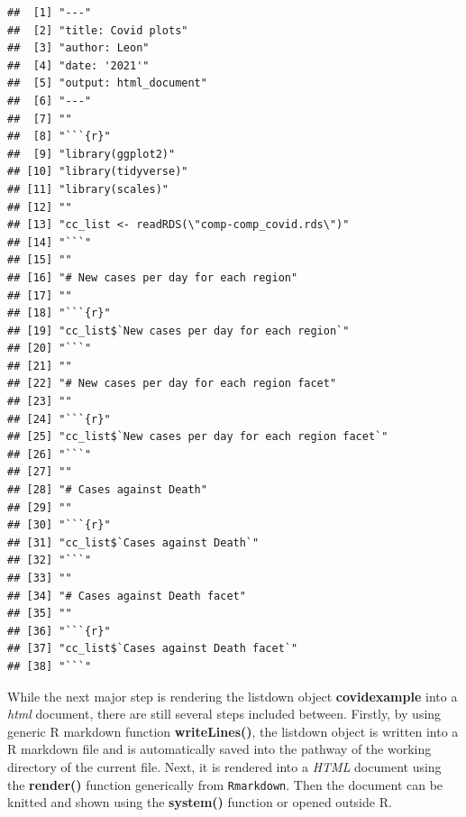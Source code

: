 \documentclass[
]{article}
\begin{document}
\begin{verbatim}
##  [1] "---"                                              
##  [2] "title: Covid plots"                               
##  [3] "author: Leon"                                     
##  [4] "date: '2021'"                                     
##  [5] "output: html_document"                            
##  [6] "---"                                              
##  [7] ""                                                 
##  [8] "```{r}"                                           
##  [9] "library(ggplot2)"                                 
## [10] "library(tidyverse)"                               
## [11] "library(scales)"                                  
## [12] ""                                                 
## [13] "cc_list <- readRDS(\"comp-comp_covid.rds\")"      
## [14] "```"                                              
## [15] ""                                                 
## [16] "# New cases per day for each region"              
## [17] ""                                                 
## [18] "```{r}"                                           
## [19] "cc_list$`New cases per day for each region`"      
## [20] "```"                                              
## [21] ""                                                 
## [22] "# New cases per day for each region facet"        
## [23] ""                                                 
## [24] "```{r}"                                           
## [25] "cc_list$`New cases per day for each region facet`"
## [26] "```"                                              
## [27] ""                                                 
## [28] "# Cases against Death"                            
## [29] ""                                                 
## [30] "```{r}"                                           
## [31] "cc_list$`Cases against Death`"                    
## [32] "```"                                              
## [33] ""                                                 
## [34] "# Cases against Death facet"                      
## [35] ""                                                 
## [36] "```{r}"                                           
## [37] "cc_list$`Cases against Death facet`"              
## [38] "```"
\end{verbatim}

While the next major step is rendering the listdown object
\textbf{covidexample} into a \emph{html} document, there are still
several steps included between. Firstly, by using generic R markdown
function \textbf{writeLines()}, the listdown object is written into a R
markdown file and is automatically saved into the pathway of the working
directory of the current file. Next, it is rendered into a \emph{HTML}
document using the \textbf{render()} function generically from
\texttt{Rmarkdown}. Then the document can be knitted and shown using the
\textbf{system()} function or opened outside R.
\end{document}
